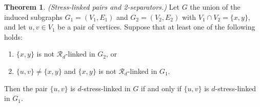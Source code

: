 \documentclass[11pt,a4paper,dvipsnames]{scrartcl}
\theoremstyle{definition}
\newtheorem{theorem}{Theorem}[section]
\newcommand{\strongly}[1]{${#1}$-stress-linked}
\begin{document}
\begin{theorem}\label{theorem:2separatorconverse} \emph{(Stress-linked pairs and 2-separators.)} \newline
    Let $G$ the union of the induced subgraphs $G_1 = (V_1,E_1)$ and $G_2 = (V_2,E_2)$ with $V_1 \cap V_2 = \{x,y\}$, and let $u,v \in V_1$ be a pair of vertices. Suppose that at least one of the following holds:
    \begin{enumerate}
        \item $\{x,y\}$ is not $\mathcal{R}_d$-linked in $G_2$, or
        \item $\{u,v\} \neq \{x,y\}$ and $\{x,y\}$ is not $\mathcal{R}_d$-linked in $G_1$.
    \end{enumerate}
    Then the pair $\{u,v\}$ is \strongly{d} in $G$ if and only if $\{u,v\}$ is \strongly{d} in $G_1$. 
\end{theorem}
\end{document}
